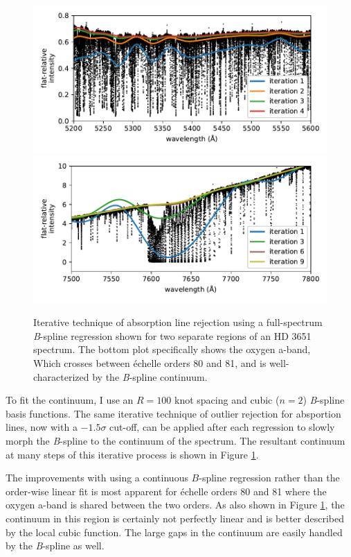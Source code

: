\begin{figure}
    \centering
    \includegraphics[width=\textwidth]{figures-5/cont-norm-bspline.pdf}
    \includegraphics[width=\textwidth]{figures-5/cont-norm-bspline-oxygen.pdf}
    \caption[Continuum normalization iterative absorption line rejection]{Iterative technique of absorption line rejection using a full-spectrum \textit{B}-spline regression shown for two separate regions of an HD 3651 spectrum. The bottom plot specifically shows the oxygen a-band, Which crosses between \'echelle orders 80 and 81, and is well-characterized by the \textit{B}-spline continuum.}
    \label{fig:cont-norm-bspline}
\end{figure}

To fit the continuum, I use an $R=100$ knot spacing and cubic ($n=2$) \textit{B}-spline basis functions. The same iterative technique of outlier rejection for absportion lines, now with a $-1.5\sigma$ cut-off, can be applied after each regression to slowly morph the \textit{B}-spline to the continuum of the spectrum. The resultant continuum at many steps of this iterative process is shown in Figure \ref{fig:cont-norm-bspline}.

The improvements with using a continuous $B$-spline regression rather than the order-wise linear fit is most apparent for \'{e}chelle orders 80 and 81 where the oxygen a-band is shared between the two orders. As also shown in Figure \ref{fig:cont-norm-bspline}, the continuum in this region is certainly not perfectly linear and is better described by the local cubic function. The large gaps in the continuum are easily handled by the \textit{B}-spline as well.

